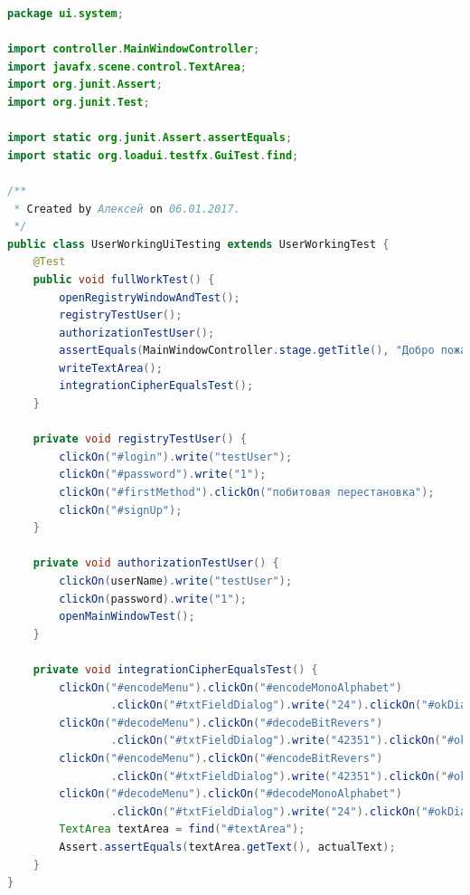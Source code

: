\documentclass[a4paper,12pt]{article}
\begin{document}
\begin{lstlisting}[language=java, caption=код модуля UserWorkingUiTesting.java]
package ui.system;

import controller.MainWindowController;
import javafx.scene.control.TextArea;
import org.junit.Assert;
import org.junit.Test;

import static org.junit.Assert.assertEquals;
import static org.loadui.testfx.GuiTest.find;

/**
 * Created by Алексей on 06.01.2017.
 */
public class UserWorkingUiTesting extends UserWorkingTest {
    @Test
    public void fullWorkTest() {
        openRegistryWindowAndTest();
        registryTestUser();
        authorizationTestUser();
        assertEquals(MainWindowController.stage.getTitle(), "Добро пожаловать, Неизвестный");
        writeTextArea();
        integrationCipherEqualsTest();
    }

    private void registryTestUser() {
        clickOn("#login").write("testUser");
        clickOn("#password").write("1");
        clickOn("#firstMethod").clickOn("побитовая перестановка");
        clickOn("#signUp");
    }

    private void authorizationTestUser() {
        clickOn(userName).write("testUser");
        clickOn(password).write("1");
        openMainWindowTest();
    }

    private void integrationCipherEqualsTest() {
        clickOn("#encodeMenu").clickOn("#encodeMonoAlphabet")
                .clickOn("#txtFieldDialog").write("24").clickOn("#okDialog");
        clickOn("#decodeMenu").clickOn("#decodeBitRevers")
                .clickOn("#txtFieldDialog").write("42351").clickOn("#okDialog");
        clickOn("#encodeMenu").clickOn("#encodeBitRevers")
                .clickOn("#txtFieldDialog").write("42351").clickOn("#okDialog");
        clickOn("#decodeMenu").clickOn("#decodeMonoAlphabet")
                .clickOn("#txtFieldDialog").write("24").clickOn("#okDialog");
        TextArea textArea = find("#textArea");
        Assert.assertEquals(textArea.getText(), actualText);
    }
}
\end{lstlisting}
\end{document}
